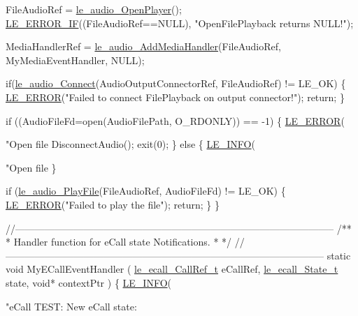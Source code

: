 \begin{DoxyCodeInclude}
{{{{{    FileAudioRef = \hyperlink{le__audio__interface_8h_a92eb1b6377f50ff07b97c5b8546f01ec}{le\_audio\_OpenPlayer}();
    \hyperlink{le__log_8h_aceaf11a11691d6c676e36dd317b38dbd}{LE\_ERROR\_IF}((FileAudioRef==NULL), \textcolor{stringliteral}{"OpenFilePlayback returns NULL!"});

    MediaHandlerRef = \hyperlink{le__audio__interface_8h_a9996ac9d23333cf8219f28b69cac4f81}{le\_audio\_AddMediaHandler}(FileAudioRef,
                                                MyMediaEventHandler,
                                                NULL);

    \textcolor{keywordflow}{if}(\hyperlink{le__audio__interface_8h_a338df65b2fb1ae0140d86880adbcf0de}{le\_audio\_Connect}(AudioOutputConnectorRef, FileAudioRef) != LE\_OK)
    \{
        \hyperlink{le__log_8h_a353590f91b3143a7ba3a416ae5a50c3d}{LE\_ERROR}(\textcolor{stringliteral}{"Failed to connect FilePlayback on output connector!"});
        \textcolor{keywordflow}{return};
    \}

    \textcolor{keywordflow}{if} ((AudioFileFd=open(AudioFilePath, O\_RDONLY)) == -1)
    \{
        \hyperlink{le__log_8h_a353590f91b3143a7ba3a416ae5a50c3d}{LE\_ERROR}(\textcolor{stringliteral}{"Open file %
        DisconnectAudio();
        exit(0);
    \}
    \textcolor{keywordflow}{else}
    \{
        \hyperlink{le__log_8h_a23e6d206faa64f612045d688cdde5808}{LE\_INFO}(\textcolor{stringliteral}{"Open file %
    \}

    \textcolor{keywordflow}{if} (\hyperlink{le__audio__interface_8h_aea2c5d0b394cfab87503639c534300c9}{le\_audio\_PlayFile}(FileAudioRef, AudioFileFd) != LE\_OK)
    \{
        \hyperlink{le__log_8h_a353590f91b3143a7ba3a416ae5a50c3d}{LE\_ERROR}(\textcolor{stringliteral}{"Failed to play the file"});
        \textcolor{keywordflow}{return};
    \}
\}

\textcolor{comment}{//--------------------------------------------------------------------------------------------------}\textcolor{comment}{}
\textcolor{comment}{/**}
\textcolor{comment}{ * Handler function for eCall state Notifications.}
\textcolor{comment}{ *}
\textcolor{comment}{ */}
\textcolor{comment}{//--------------------------------------------------------------------------------------------------}
\textcolor{keyword}{static} \textcolor{keywordtype}{void} MyECallEventHandler
(
    \hyperlink{le__ecall__interface_8h_a8536728653b7b3cdd6b298c6e7b67705}{le\_ecall\_CallRef\_t}  eCallRef,
    \hyperlink{le__ecall__interface_8h_a233609e4724e549a1405f9177c0a07dd}{le\_ecall\_State\_t}    state,
    \textcolor{keywordtype}{void}*               contextPtr
)
\{
    \hyperlink{le__log_8h_a23e6d206faa64f612045d688cdde5808}{LE\_INFO}(\textcolor{stringliteral}{"eCall TEST: New eCall state: %

}}}}}}}}
\end{DoxyCodeInclude}
